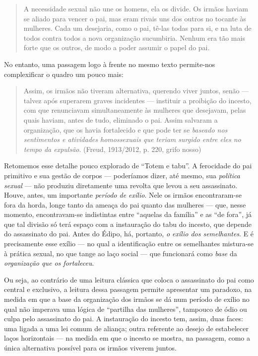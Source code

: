 \begin{quote}
A necessidade sexual não une os homens, ela os divide. Os irmãos haviam
se aliado para vencer o pai, mas eram rivais uns dos outros no tocante
às mulheres. Cada um desejaria, como o pai, tê-las todas para si, e na
luta de todos contra todos a nova organização sucumbiria. Nenhum era tão
mais forte que os outros, de modo a poder assumir o papel do pai.
\end{quote}

No entanto, uma passagem logo à frente no mesmo texto permite-nos
complexificar o quadro um pouco mais:

\begin{quote}
Assim, os irmãos não tiveram alternativa, querendo viver juntos, senão
--- talvez após superarem graves incidentes --- instituir a proibição do
incesto, com que renunciavam simultaneamente às mulheres que desejavam,
pelas quais haviam, antes de tudo, eliminado o pai. Assim salvaram a
organização, que os havia fortalecido e que pode ter se \emph{baseado
nos sentimentos e atividades homossexuais que teriam surgido entre eles
no tempo da expulsão}. (Freud, 1913/2012, p. 220, grifo nosso)
\end{quote}

Retomemos esse detalhe pouco explorado de ``Totem e tabu''. A ferocidade
do pai primitivo e sua gestão de corpos --- poderíamos dizer, até mesmo,
sua \emph{política sexual} --- não produziu diretamente uma revolta que
levou a seu assassinato. Houve, antes, um importante \emph{período de
exílio}. Nele os irmãos encontraram-se fora da horda, longe tanto da
ameaça do pai quanto das mulheres --- que, nesse momento, encontravam-se
indistintas entre ``aquelas da família'' e as ``de fora'', já que tal
divisão só terá espaço com a instauração do tabu do incesto, que depende
do assassinato do pai. Antes do Édipo, há, portanto, \emph{o exílio dos
semelhantes}. E é precisamente esse exílio --- no qual a identificação
entre os semelhantes mistura-se à prática sexual, no que tange ao laço
social --- que funcionará como \emph{base} da \emph{organização que os
fortaleceu}.

Ou seja, ao contrário de uma leitura clássica que coloca o assassinato
do pai como central e exclusivo, a leitura dessa passagem permite
apresentar um paradoxo, na medida em que a base da organização dos
irmãos se dá num período de exílio no qual não imperava uma lógica de
``partilha das mulheres'', tampouco de ódio ou culpa pelo assassinato do
pai. A instauração do incesto tem, assim, duas faces: uma ligada a uma
lei comum de aliança; outra referente ao desejo de estabelecer laços
horizontais --- na medida em que o incesto se mostra, na passagem, como
a única alternativa possível para os irmãos viverem juntos.

